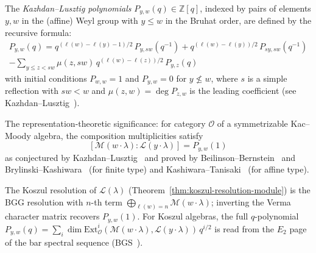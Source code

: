 \begin{definition}
\label{def:kl-polynomials}
The \emph{Kazhdan--Lusztig polynomials}
$P_{y,w}(q) \in \mathbb{Z}[q]$, indexed by pairs of elements
$y, w$ in the (affine) Weyl group with $y \leq w$ in the Bruhat
order, are defined by the recursive formula:
\begin{multline*}
P_{y,w}(q) = q^{(\ell(w) - \ell(y) - 1)/2}\,
P_{y,sw}(q^{-1})
+ q^{(\ell(w) - \ell(y))/2}\, P_{sy,sw}(q^{-1}) \\
- \sum_{y \leq z < sw} \mu(z, sw)\, q^{(\ell(w) - \ell(z))/2}\, P_{y,z}(q)
\end{multline*}
with initial conditions $P_{w,w} = 1$ and $P_{y,w} = 0$ for
$y \not\leq w$, where $s$ is a simple reflection with $sw < w$
and $\mu(z,w) = \deg P_{z,w}$ is the leading coefficient
(see Kazhdan--Lusztig~\cite{KL79}).

The representation-theoretic significance: for category
$\mathcal{O}$ of a symmetrizable Kac--Moody algebra,
the composition multiplicities satisfy
\begin{equation}\label{eq:kl-multiplicity}
[\mathcal{M}(w \cdot \lambda) : \mathcal{L}(y \cdot \lambda)]
= P_{y,w}(1)
\end{equation}
as conjectured by Kazhdan--Lusztig~\cite{KL79} and proved by
Beilinson--Bernstein~\cite{BB81} and Brylinski--Kashiwara~\cite{BK81}
(for finite type) and Kashiwara--Tanisaki~\cite{KT95} (for affine type).
\end{definition}

\begin{remark}
\label{rem:kl-bar}
The Koszul resolution of $\mathcal{L}(\lambda)$ (Theorem~\ref{thm:koszul-resolution-module}) is the BGG resolution with $n$-th term $\bigoplus_{\ell(w) = n} \mathcal{M}(w \cdot \lambda)$; inverting the Verma character matrix recovers $P_{y,w}(1)$.  For Koszul algebras, the full $q$-polynomial $P_{y,w}(q) = \sum_i \dim \mathrm{Ext}^i_{\mathcal{O}}(\mathcal{M}(w \cdot \lambda), \mathcal{L}(y \cdot \lambda))\, q^{i/2}$ is read from the $E_2$ page of the bar spectral sequence (BGS~\cite{BGS96}).
\end{remark}

